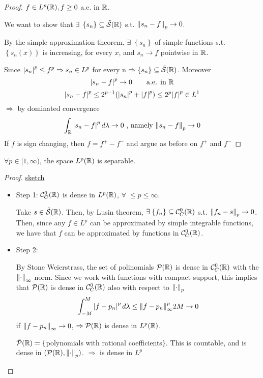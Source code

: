 \begin{proof}
    \(f \in L^p(\mathbb{R}), f \geq 0\) a.e. in \(\mathbb{R}\).

    We want to show that \(\exists \; \left\{ s_n \right\} \subseteq \tilde{\mathcal{S}}(\mathbb{R})\) s.t. \(\norm{s_n - f}_p \to 0\).

    By the simple approximation theorem, \(\exists \; \left\{ s_n \right\}\) of simple functions s.t. \(\left\{ s_n(x) \right\}\) is increasing, for every \(x\), and \(s_n \to f\) pointwise in \(\mathbb{R}\).

    Since \(\abs{s_n}^p \leq f^p \Rightarrow s_n \in L^p\) for every n \(\Rightarrow \left\{ s_n \right\} \subseteq \tilde{\mathcal{S}}(\mathbb{R})\). Moreover
    \[
        \abs{s_n -f}^p \to 0 \qquad \text{a.e. in } \mathbb{R}
    \]
    \[
        \abs{s_n -f }^p \leq 2^{p-1} (\abs{s_n}^p + \abs{f}^p) \leq 2^p \abs{f}^p \in L^1
    \]
    \(\Rightarrow \) by dominated convergence
    \[
        \int_{\mathbb{R}} \abs{s_n - f }^p \, d\lambda \to 0 \text{ , namely } \norm{s_n -f}_p \to 0
    \]
    If \(f\) is sign changing, then \(f = f^+ - f^-\)  and argue as before on \(f^+\) and \(f^-\)
\end{proof}

\begin{theorem}
    \( \forall p \in [1, \infty)\), the space \(L^p(\mathbb{R})\) is separable. 
\end{theorem}
\begin{proof}
    \noindent\underline{sketch}
    \begin{itemize}
        \item Step 1: \(\mathcal{C}_C^0(\mathbb{R}) \) is dense in \(L^p(\mathbb{R} )\), \(\forall \; \leq p \leq \infty\).
        
        Take \(s \in \tilde{\mathcal{S}}(\mathbb{R})\). Then, by Lusin theorem, \(\exists \; \{f_n\} \subseteq \mathcal{C}_C^0(\mathbb{R})\) s.t. \(\norm{f_n -s }_p \to 0\).
        Then, since any \(f \in L^p\) can be approximated by simple integrable functions, we have that \(f\) can be approximated by functions in \(\mathcal{C}_C^0(\mathbb{R})\).

        \item Step 2: 
        
        By Stone Weierstrass, the set of polinomials \(\mathcal{P}(\mathbb{R})\) is dense in \(\mathcal{C}_C^0(\mathbb{R})\) with the \(\norm{\cdot}_\infty\) norm. 
        Since we work with functions with compact support, this implies that \(\mathcal{P}(\mathbb{R})\) is dense in \(\mathcal{C}_C^0(\mathbb{R})\) also with respect to \(\norm{\cdot}_p\)
        \[
            \int_{-M}^M \abs{f - p_n }^p \, d\lambda \leq \norm{f - p_n }^p_\infty 2M \to 0
        \] 
        if \(\norm{f - p_n}_\infty \to 0\), \(\Rightarrow \mathcal{P}(\mathbb{R})\) is dense in \(L^p(\mathbb{R})\).

        \(\tilde{\mathcal{P}}(\mathbb{R}) = \{\)polynomials with rational coefficients\(\}\). 
        This is countable, and is dense in \((\mathcal{P}(\mathbb{R}), \norm{\cdot}_p)\). \(\Rightarrow \) is dense in \(L^p\) 
    \end{itemize}
\end{proof}

